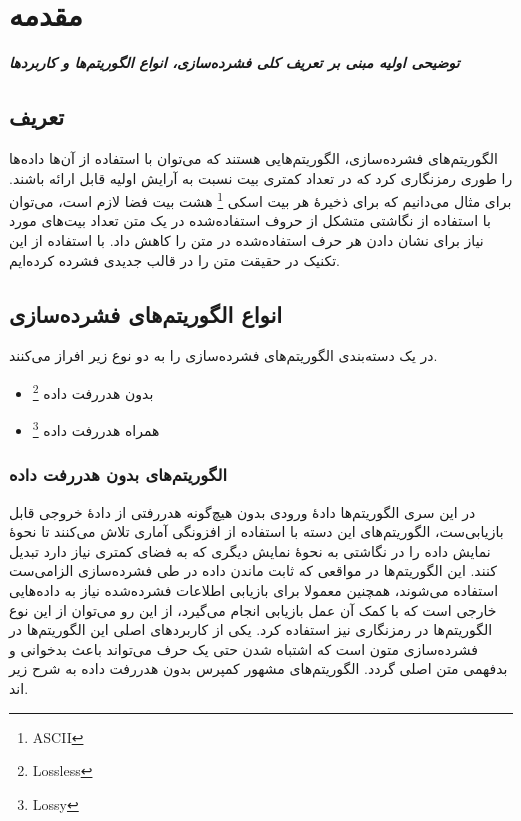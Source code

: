 \chapter{مقدمه}
\noindent
\textbf{
	\textit{
		توضیحی اولیه مبنی بر تعریف کلی فشرده‌سازی، انواع الگوریتم‌ها و کاربردها
	}
}
\pagebreak
\section{تعریف}

الگوریتم‌های فشرده‌سازی، الگوریتم‌هایی هستند که می‌توان با استفاده از آن‌ها داده‌ها را طوری رمزنگاری کرد که در تعداد 	کمتری بیت نسبت به آرایش اولیه
قابل ارائه باشند.
\cite{data_compression}
برای مثال می‌دانیم که برای ذخیرهٔ هر بیت اسکی
\footnote{ASCII}
 هشت بیت فضا لازم است، می‌توان با استفاده از نگاشتی متشکل از حروف استفاده‌شده در 
یک متن تعداد بیت‌های مورد نیاز برای نشان دادن هر حرف استفاده‌شده در متن را کاهش داد.
با استفاده از این تکنیک در حقیقت متن را در قالب جدیدی فشرده کرده‌ایم.

\section{انواع الگوریتم‌های فشرده‌سازی}

در یک دسته‌بندی الگوریتم‌های فشرده‌سازی را به دو نوع زیر افراز می‌کنند.
\begin{itemize}
	\item  بدون هدررفت داده \footnote{Lossless}
	\item  همراه هدررفت داده \footnote{Lossy}
\end{itemize}

\subsection{الگوریتم‌های بدون هدررفت داده}
در این سری الگوریتم‌ها دادهٔ ورودی بدون هیچ‌گونه هدررفتی از دادهٔ خروجی قابل بازیابی‌ست، الگوریتم‌های 
این دسته با استفاده از افزونگی آماری تلاش می‌کنند تا نحوهٔ نمایش داده را در نگاشتی به نحوهٔ نمایش دیگری که به فضای کمتری نیاز دارد 
تبدیل کنند.
این الگوریتم‌ها در مواقعی که 
ثابت ماندن داده در طی فشرده‌سازی الزامی‌ست استفاده می‌شوند، همچنین معمولا برای بازیابی اطلاعات فشرده‌شده نیاز به 
داده‌هایی خارجی است که با کمک آن عمل بازیابی انجام می‌گیرد، از این رو می‌توان از این نوع الگوریتم‌ها در رمزنگاری نیز 
استفاده کرد. یکی از کاربردهای اصلی این الگوریتم‌ها در فشرده‌سازی متون است که اشتباه شدن حتی یک حرف می‌تواند باعث بدخوانی و 
بدفهمی متن اصلی گردد. الگوریتم‌های مشهور کمپرس بدون هدررفت داده به شرح زیر اند.
\cite{data_types}

